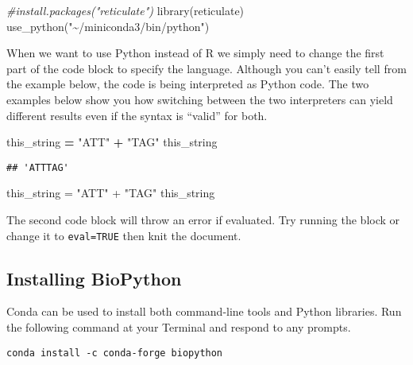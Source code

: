 \documentclass[
]{article}
\newenvironment{Shaded}{\begin{snugshade}}{\end{snugshade}}
\newcommand{\CommentTok}[1]{\textcolor[rgb]{0.56,0.35,0.01}{\textit{#1}}}
\newcommand{\FunctionTok}[1]{\textcolor[rgb]{0.00,0.00,0.00}{#1}}
\newcommand{\NormalTok}[1]{#1}
\newcommand{\OperatorTok}[1]{\textcolor[rgb]{0.81,0.36,0.00}{\textbf{#1}}}
\newcommand{\OtherTok}[1]{\textcolor[rgb]{0.56,0.35,0.01}{#1}}
\newcommand{\SpecialCharTok}[1]{\textcolor[rgb]{0.00,0.00,0.00}{#1}}
\newcommand{\StringTok}[1]{\textcolor[rgb]{0.31,0.60,0.02}{#1}}
\begin{document}
\begin{Shaded}
\begin{Highlighting}[]
\CommentTok{\#install.packages("reticulate")}
\FunctionTok{library}\NormalTok{(reticulate)}
\FunctionTok{use\_python}\NormalTok{(}\StringTok{"\textasciitilde{}/miniconda3/bin/python"}\NormalTok{)}
\end{Highlighting}
\end{Shaded}

When we want to use Python instead of R we simply need to change the
first part of the code block to specify the language. Although you can't
easily tell from the example below, the code is being interpreted as
Python code. The two examples below show you how switching between the
two interpreters can yield different results even if the syntax is
``valid'' for both.

\begin{Shaded}
\begin{Highlighting}[]
\NormalTok{this\_string }\OperatorTok{=} \StringTok{"ATT"} \OperatorTok{+} \StringTok{"TAG"}
\NormalTok{this\_string}
\end{Highlighting}
\end{Shaded}

\begin{verbatim}
## 'ATTTAG'
\end{verbatim}

\begin{Shaded}
\begin{Highlighting}[]
\NormalTok{this\_string }\OtherTok{=} \StringTok{"ATT"} \SpecialCharTok{+} \StringTok{"TAG"}
\NormalTok{this\_string}
\end{Highlighting}
\end{Shaded}

The second code block will throw an error if evaluated. Try running the
block or change it to \texttt{eval=TRUE} then knit the document.

\hypertarget{installing-biopython}{%
\subsection{Installing BioPython}\label{installing-biopython}}

Conda can be used to install both command-line tools and Python
libraries. Run the following command at your Terminal and respond to any
prompts.

\begin{verbatim}
conda install -c conda-forge biopython
\end{verbatim}
\end{document}
